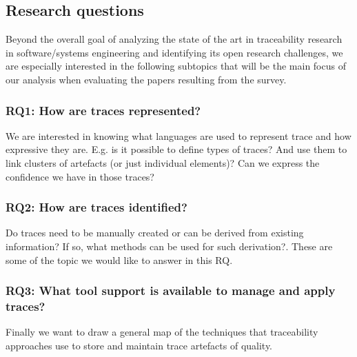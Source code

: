 \subsection{Research questions}\label{sec:rqs}
Beyond the overall goal of analyzing the state of the art in traceability research in software/systems engineering and identifying its open research challenges, we are especially interested in the following subtopics that will be the main focus of our analysis when evaluating the papers resulting from the survey.

\subsubsection{RQ1: How are traces represented?}
\label{sec:rq1}
We are interested in knowing what languages are used to represent trace and how expressive they are. E.g. is it possible to define types of traces? And use them to link clusters of artefacts (or just individual elements)? Can we express the confidence we have in those traces?


\subsubsection{RQ2: How are traces identified?}
\label{sec:rq2}
Do traces need to be manually created or can be derived from existing information? If so, what methods can be used for such derivation?. These are some of the topic we would like to answer in this RQ.

\subsubsection{RQ3: What tool support is available to manage and apply traces?}
\label{sec:rq3}
Finally we want to draw a general map of the techniques that traceability approaches use to store and maintain trace artefacts of quality.


